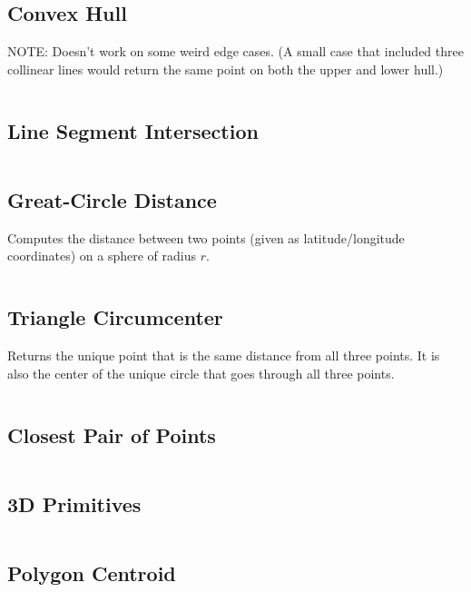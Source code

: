 \documentclass[9pt,a4paper,twocolumn,landscape,oneside]{amsart}
\newcommand{\code}[1]{\inputminted{cpp}{_code/#1}}
\newif\ifverbose
\begin{document}
    \subsection{Convex Hull}
        \ifverbose
        An algorithm that finds the Convex Hull of a set of points.
        \fi
        NOTE: Doesn't work on some weird edge cases. (A small case that
        included three collinear lines would return the same point on both the
        upper and lower hull.)
        \code{geometry/convex_hull.cpp}

    \subsection{Line Segment Intersection}
        \ifverbose
        Computes the intersection between two line segments.
        \fi
        \code{geometry/line_segment_intersect.cpp}

    \subsection{Great-Circle Distance}
        Computes the distance between two points (given as latitude/longitude
        coordinates) on a sphere of radius $r$.
        \code{geometry/gc_distance.cpp}

    \subsection{Triangle Circumcenter}
        Returns the unique point that is the same distance from all three
        points. It is also the center of the unique circle that goes through
        all three points.
        \code{geometry/circumcenter.cpp}

    \subsection{Closest Pair of Points}
        \ifverbose
        A sweep line algorithm for computing the distance between the closest
        pair of points.
        \fi
        \code{geometry/closest_pair.cpp}

    \subsection{3D Primitives}
        \ifverbose
        Three-dimensional geometry primitives.
        \fi
        \code{geometry/primitives3d.cpp}

    \subsection{Polygon Centroid}
        \code{geometry/polygon_centroid.cpp}
\end{document}
